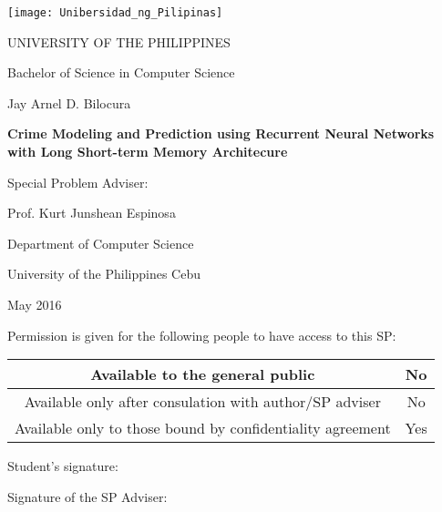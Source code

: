 \begin{permission}
    \texttt{[image: Unibersidad\_ng\_Pilipinas]}
    \par\MakeUppercase{University of the Philippines}
    \par Bachelor of Science in Computer Science
    \vspace{1cm}
    \par Jay Arnel D. Bilocura
    \vspace{1cm}
    \par\textbf{Crime Modeling and Prediction using Recurrent Neural Networks with Long Short-term Memory Architecure}
    \vspace{1cm}
    \par Special Problem Adviser:
    \par Prof. Kurt Junshean Espinosa
    \vspace{1cm}
    \par Department of Computer Science
    \par University of the Philippines Cebu
    \vspace{1cm}
    \par May 2016
    \vspace{1cm}
    \par Permission is given for the following people to have access to this SP:
    \begin{table}[H]
      \centering
      \begin{tabular}{|c|c|}
          \hline
          Available to the general public &No \\
          \hline
          Available only after consulation with author/SP adviser &No \\
          \hline
          Available only to those bound by confidentiality agreement &Yes \\
          \hline
        \end{tabular}
    \end{table}
    \par Student's signature: \hspace{3cm}
    \par Signature of the SP Adviser: \hspace{4cm}
\end{permission}